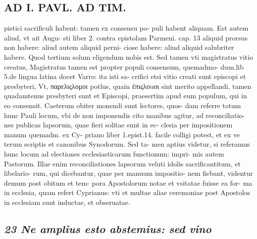 \documentclass{article}
\begin{document}
\begin{pages}
\section*{AD I. PAVL. AD TIM. }
\marginpar{[ p.320 ]}\pstart pistici sacrificuli habent: tamen ex consensu po- puli habent aliquam. Est autem aliud, vt ait Augu- sti liber 2. contra epistolam Parmeni. cap. 13 aliquid prorsus non habere: aliud autem aliquid perni- ciose habere: aliud aliquid salubriter habere. Quod tertium solum eligendum nobis est. Sed tamen vti magistratus vitio creatus, Magistratus tamen est propter populi consensum, quemadmo- dum.lib 5.de lingua latina docet Varro: ita isti sa- crifici etsi vitio creati sunt episcopi et presbyteri, Vt, παρελιςλομοι potlus, quain ἐπιςλοuοι sint merito appellandi, tamen quadamtenus presbyteri sunt et Episcopi, praesertim apud eum populum, qui in eo consensit.  \pend\pstart Caeterum obiter monendi sunt lectores, quos- dam referre totum hunc Pauli locum, vbi de non imponendis cito manibus agitur, ad reconciliatio- nes publicas lapsorum, quae fieri solitae sunt in ec- clesia per impositionem manum quemadm. ex Cy- priano liber 1.epist.14. facile colligi potest, et ex ve terum scriptis et canonibus Synodorum. Sed ta- men aptius videtur, si referamus hunc locum ad electiones ecclesiasticarum functionum: impri- mis autem Pastorum. Illae enim reconciliationes lapsorum veluti idolis sacrificantitum, et libelario- rum, qui dicebantur, quae per manuum impositio- nem fiebant, videntur demum post obitum et tem- pora Apostolorum notae et vsitatae fuisse ea for- ma in ecclesia, quam refert Cyprianus: vti et multae aliae ceremoniae post Apostolos in ecclesiam sunt inductae, et obseruatae.  \pend
{}
{}
\subsection*{\textit{23 Ne amplius esto abstemius: sed vino }}

\end{pages}
\end{document}
